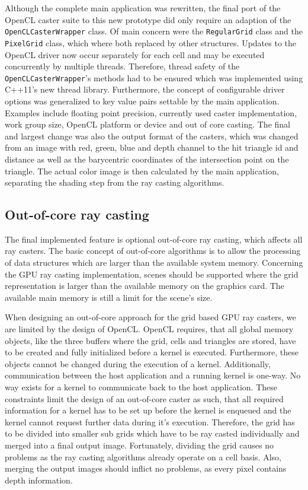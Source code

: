 Although the complete main application was rewritten, the final port of the OpenCL caster suite to this new prototype did only require an adaption of the \lstinline!OpenCLCasterWrapper! class. Of main concern were the \lstinline!RegularGrid! class and the \lstinline!PixelGrid! class, which where both replaced by other structures. Updates to the OpenCL driver now occur separately for each cell and may be executed concurrently by multiple threads. Therefore, thread safety of the \lstinline!OpenCLCasterWrapper!'s methods had to be ensured which was implemented using C++11's new thread library. Furthermore, the concept of configurable driver options was generalized to key value pairs settable by the main application. Examples include floating point precision, currently used caster implementation, work group size, OpenCL platform or device and out of core casting. The final and largest change was also the output format of the casters, which was changed from an image with red, green, blue and depth channel to the hit triangle id and distance as well as the barycentric coordinates of the intersection point on the triangle. The actual color image is then calculated by the main application, separating the shading step from the ray casting algorithms.


\subsection{Out-of-core ray casting}
\label{sec:out_of_core}

The final implemented feature is optional out-of-core ray casting, which affects all ray casters. The basic concept of out-of-core algorithms is to allow the processing of data structures which are larger than the available system memory. Concerning the GPU ray casting implementation, scenes should be supported where the grid representation is larger than the available memory on the graphics card. The available main memory is still a limit for the scene's size.

When designing an out-of-core approach for the grid based GPU ray casters, we are limited by the design of OpenCL. OpenCL requires, that all global memory objects, like the three buffers where the grid, cells and triangles are stored, have to be created and fully initialized before a kernel is executed. Furthermore, these objects cannot be changed during the execution of a kernel. Additionally, communication between the host application and a running kernel is one-way. No way exists for a kernel to communicate back to the host application. These constraints limit the design of an out-of-core caster as such, that all required information for a kernel has to be set up before the kernel is enqueued and the kernel cannot request further data during it's execution. Therefore, the grid has to be divided into smaller sub grids which have to be ray casted individually and merged into a final output image. Fortunately, dividing the grid causes no problems as the ray casting algorithms already operate on a cell basis. Also, merging the output images should inflict no problems, as every pixel contains depth information.

